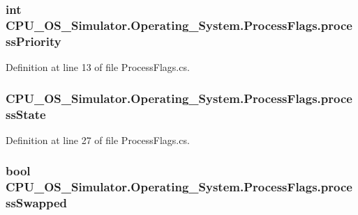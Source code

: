 \subsubsection[{process\+Priority}]{\setlength{\rightskip}{0pt plus 5cm}int C\+P\+U\+\_\+\+O\+S\+\_\+\+Simulator.\+Operating\+\_\+\+System.\+Process\+Flags.\+process\+Priority}\label{struct_c_p_u___o_s___simulator_1_1_operating___system_1_1_process_flags_a0a14c1f617bd3cd4d2b28b5f13cf83d5}


Definition at line 13 of file Process\+Flags.\+cs.

\hypertarget{struct_c_p_u___o_s___simulator_1_1_operating___system_1_1_process_flags_ac5d7a47d263eb80357b0a7900858bd98}{}
\subsubsection[{process\+State}]{ C\+P\+U\+\_\+\+O\+S\+\_\+\+Simulator.\+Operating\+\_\+\+System.\+Process\+Flags.\+process\+State}\label{struct_c_p_u___o_s___simulator_1_1_operating___system_1_1_process_flags_ac5d7a47d263eb80357b0a7900858bd98}


Definition at line 27 of file Process\+Flags.\+cs.

\hypertarget{struct_c_p_u___o_s___simulator_1_1_operating___system_1_1_process_flags_aa57e25afb816fa9a0e11c43920640992}{}
\subsubsection[{process\+Swapped}]{\setlength{\rightskip}{0pt plus 5cm}bool C\+P\+U\+\_\+\+O\+S\+\_\+\+Simulator.\+Operating\+\_\+\+System.\+Process\+Flags.\+process\+Swapped}\label{struct_c_p_u___o_s___simulator_1_1_operating___system_1_1_process_flags_aa57e25afb816fa9a0e11c43920640992}


